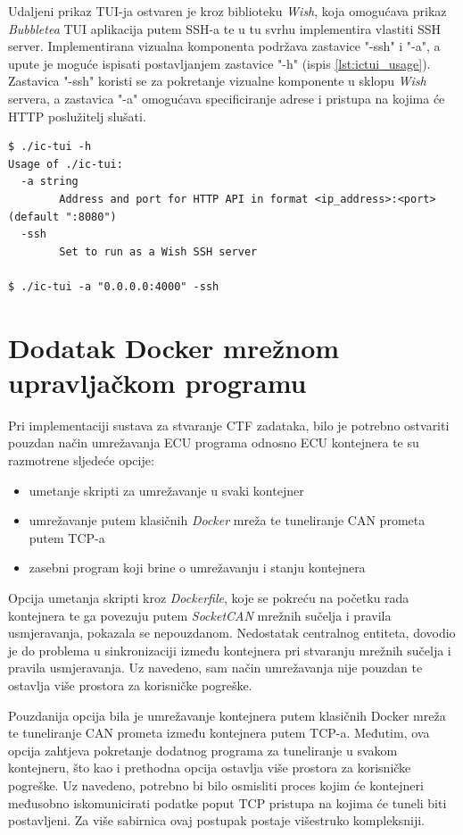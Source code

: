 \documentclass[times, utf8, diplomski, numeric]{fer}
\begin{document}
Udaljeni prikaz TUI-ja ostvaren je kroz biblioteku \textit{Wish}, koja omogućava prikaz \textit{Bubbletea} TUI aplikacija putem SSH-a te u tu svrhu implementira vlastiti SSH server. Implementirana vizualna komponenta podržava zastavice "-ssh" i "-a", a upute je moguće ispisati postavljanjem zastavice "-h" (ispis \ref{lst:ictui_usage}). Zastavica "-ssh" koristi se za pokretanje vizualne komponente u sklopu \textit{Wish} servera, a zastavica "-a" omogućava specificiranje adrese i pristupa na kojima će HTTP poslužitelj slušati.
\bigskip
\begin{lstlisting}[style=terminal, label={lst:ictui_usage},caption={Korištenje vizualne komponente}]
$ ./ic-tui -h
Usage of ./ic-tui:
  -a string
    	Address and port for HTTP API in format <ip_address>:<port> (default ":8080")
  -ssh
    	Set to run as a Wish SSH server

$ ./ic-tui -a "0.0.0.0:4000" -ssh
\end{lstlisting}
\newpage
\section{Dodatak Docker mrežnom upravljačkom programu} \label{sec:dockercan}
Pri implementaciji sustava za stvaranje CTF zadataka, bilo je potrebno ostvariti pouzdan način umrežavanja ECU programa odnosno ECU kontejnera te su razmotrene sljedeće opcije:
\begin{itemize}
    \item umetanje skripti za umrežavanje u svaki kontejner
    \item umrežavanje putem klasičnih \textit{Docker} mreža te tuneliranje CAN prometa putem TCP-a
    \item zasebni program koji brine o umrežavanju i stanju kontejnera
\end{itemize}

Opcija umetanja skripti kroz \textit{Dockerfile}, koje se pokreću na početku rada kontejnera te ga povezuju putem \textit{SocketCAN} mrežnih sučelja i pravila usmjeravanja, pokazala se nepouzdanom. Nedostatak centralnog entiteta, dovodio je do problema u sinkronizaciji između kontejnera pri stvaranju mrežnih sučelja i pravila usmjeravanja. Uz navedeno, sam način umrežavanja nije pouzdan te ostavlja više prostora za korisničke pogreške.

Pouzdanija opcija bila je umrežavanje kontejnera putem klasičnih Docker mreža te tuneliranje CAN prometa između kontejnera putem TCP-a. Međutim, ova opcija zahtjeva pokretanje dodatnog programa za tuneliranje u svakom kontejneru, što kao i prethodna opcija ostavlja više prostora za korisničke pogreške. Uz navedeno, potrebno bi bilo osmisliti proces kojim će kontejneri međusobno iskomunicirati podatke poput TCP pristupa na kojima će tuneli biti postavljeni. Za više sabirnica ovaj postupak postaje višestruko kompleksniji.
\end{document}
